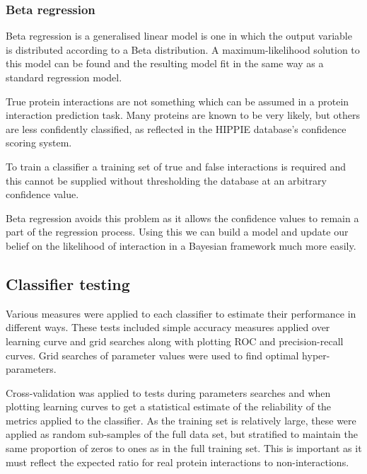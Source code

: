 \subsubsection*{Beta regression}

Beta regression is a generalised linear model is one in which the output variable is distributed according to a Beta distribution\autocite{smithson_better_2006}.
A maximum-likelihood solution to this model can be found and the resulting model fit in the same way as a standard regression model.

True protein interactions are not something which can be assumed in a protein interaction prediction task.
Many proteins are known to be very likely, but others are less confidently classified, as reflected in the \ac{HIPPIE} database's confidence scoring system\autocite{schaefer_hippie:_2012}.

To train a classifier a training set of true and false interactions is required and this cannot be supplied without thresholding the database at an arbitrary confidence value.

Beta regression avoids this problem as it allows the confidence values to remain a part of the regression process.
Using this we can build a model and update our belief on the likelihood of interaction in a Bayesian framework much more easily.

\subsection{Classifier testing}
\label{classifierverification}

%  

Various measures were applied to each classifier to estimate their performance in different ways.
These tests included simple accuracy measures applied over learning curve and grid searches along with plotting \ac{ROC} and precision-recall curves.
Grid searches of parameter values were used to find optimal hyper-parameters.

Cross-validation was applied to tests during parameters searches and when plotting learning curves to get a statistical estimate of the reliability of the metrics applied to the classifier\autocite[152]{witten_data_2011}.
As the training set is relatively large, these were applied as random sub-samples of the full data set, but stratified to maintain the same proportion of zeros to ones as in the full training set.
This is important as it must reflect the expected ratio for real protein interactions to non-interactions.

